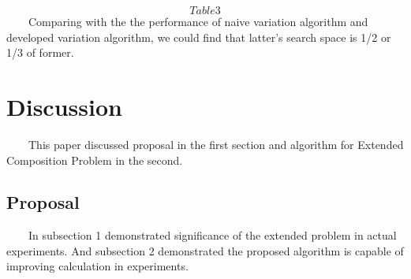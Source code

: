 \documentclass[senior,final,11pt]{iscs-thesis}
\begin{document}
\[Table3\]
~~~~Comparing with the the performance of naive variation algorithm and developed variation algorithm, we could find that latter's search space is 1/2 or 1/3 of former.
\chapter{Discussion}
~~~~This paper discussed proposal in the first section and algorithm for Extended Composition Problem in the second. 
\section{Proposal}
~~~~In subsection 1 demonstrated significance of the extended problem in actual experiments. And subsection 2 demonstrated the proposed algorithm is capable of improving calculation in experiments. 
\end{document}
